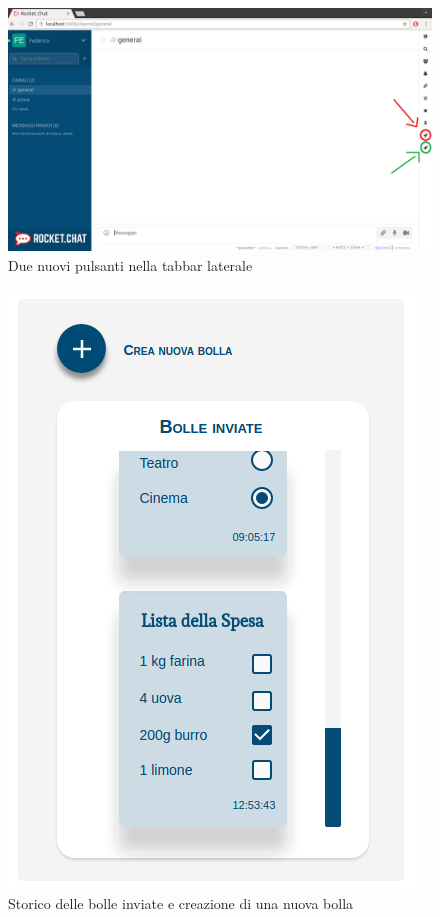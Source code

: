\begin{frame}
	\begin{figure}
		\begin{center}
			\caption{Due nuovi pulsanti nella tabbar laterale}
			\includegraphics[scale=0.23]{img/f3.png}
		\end{center}
	\end{figure}	
\end{frame}

\begin{frame}
  
  \begin{center}
  	\begin{figure}
 		\caption{Storico delle bolle inviate e creazione di una nuova bolla}
  		\includegraphics[scale=0.34]{img/mockup_1.png}
  	\end{figure}
  \end{center}
  
\end{frame}

